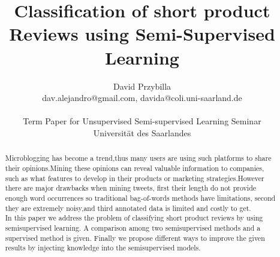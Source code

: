 \documentclass[4pt,a4paper,twocolumn]{article}
\author{David Przybilla\\dav.alejandro@gmail.com, davida@coli.uni-saarland.de\\ \\ Term Paper for Unsupervised Semi-supervised
Learning Seminar\\ Universit\"{a}t des Saarlandes}
\title{Classification of short product Reviews using Semi-Supervised Learning}
\begin{document}
\twocolumn[
	 \begin{@twocolumnfalse}
    \maketitle
  \end{@twocolumnfalse}
 ]

   \begin{abstract}
      Microblogging has become a trend,thus many users are using such platforms to share their opinions.Mining these opinions can reveal valuable information to companies, such as what features to develop in their products or marketing strategies.However there are  major drawbacks when mining tweets, first their length do not provide enough word occurrences so traditional bag-of-words methods have limitations, second they are extremely noisy,and third annotated data is limited and costly to get.\\
      In this paper we address the problem of classifying short product reviews by using semisupervised learning. A comparison among two semisupervised methods and a supervised method is given. Finally we propose different ways to improve the given results by injecting knowledge into the semisupervised models.
    \end{abstract}
\end{document}
